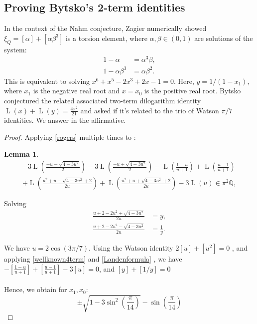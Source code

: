 \documentclass[12pt]{article}
\newtheorem{lemma}{Lemma}%
\begin{document}
\subsection{Proving Bytsko's 2-term identities}


In the context of the Nahm conjecture, Zagier \cite{Zagier2007} numerically showed $\xi_Q = [\alpha] + [\alpha\beta^3] $ is a torsion element, where $\alpha, \beta \in (0,1)$ are solutions of the system:
\begin{align*}
1 - \alpha &= \alpha^3 \beta, \\
1 - \alpha\beta^3 &= \alpha \beta^2.
\end{align*}  This is equivalent to solving $x^6 + x^5 - 2 x^3 + 2 x - 1 =0$. Here, $y=1/(1-x_1)$, where $x_1$ is the negative real root and $x=x_0$ is the positive real root. Bytsko 
 \cite{Bytsko1999} conjectured the related 
 associated two-term dilogarithm identity $\operatorname {L}(x)+\operatorname{L}(y)=\frac{4\pi^2}{21}$ and asked if it's related to the trio of Watson $\pi/7$ identities. We answer in the affirmative.

\begin{proof} Applying \eqref{rogers} multiple times to :

\begin{lemma}
    


\begin{multline*}
 -3\operatorname{L}\left( \frac{-u - \sqrt{4 - 3u^2} }{2} \right) 
 - 3 \operatorname{L}\left(\frac{-u + \sqrt{4 - 3u^2} }{2}  \right) 
 -  \operatorname{L}\left( \frac{1 - u}{u + 1} \right)  +  \operatorname{L}\left( \frac{u-1}{u + 1} \right) \\ 
 + \operatorname{L}\left( \frac{u^2 +u- \sqrt{4 - 3u^2} + 2}{2u} \right) 
+ \operatorname{L}\left( \frac{u^2+u + \sqrt{4 - 3u^2} + 2}{2u} \right) 
  -3 \operatorname{L}(u)\in \pi^2 \mathbb{Q}  , 
\end{multline*}
\end{lemma}
\noindent Solving \begin{align*}
\frac{u + 2 - 2u^2 + \sqrt{4 - 3u^2}}{2u} &= y, \\
\frac{u + 2 - 2u^2 - \sqrt{4 - 3u^2}}{2u} &= \frac{1}{y}.
\end{align*} 

\noindent We have $u=2\cos(3\pi/7)$. Using the Watson identity $2[u]+[u^2]=0$  , and applying \eqref{wellknown4term} and \eqref{Landenformula} , we have  $ -\left[ \frac{1 - u}{u + 1} \right]  +   \left[ \frac{u-1}{u + 1} \right] -3 [u]=0$, and $[y]+[1/y]=0$ 
\\
\\
\noindent Hence, we obtain  for $x_1,x_0$:
\begin{equation}
\pm\sqrt{1 - 3\sin^2\left(\frac{\pi}{14}\right)} - \sin\left(\frac{\pi}{14}\right)
\end{equation}
\end{proof}
\end{document}
